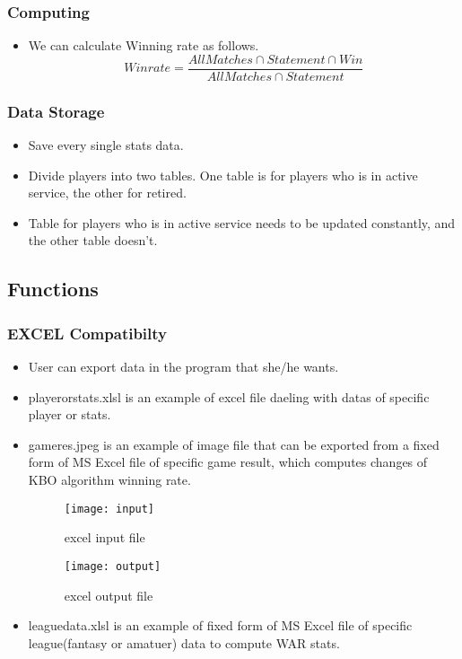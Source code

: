 \documentclass[conference,compsoc, twocolumn]{IEEEtran}
\begin{document}
\subsubsection{Computing}

\begin{itemize}
\item We can calculate Winning rate as follows. 
\begin{equation} \label{eq:winrate} Winrate = \frac{All Matches\cap Statement\cap Win}{All Matches\cap Statement} \end{equation}
\end{itemize}



\subsubsection{Data Storage}
\begin{itemize}
\item Save every single stats data.
\item Divide players  into two tables. One table is for players who is in active service, the other for retired.
\item Table for players who is in active service needs to be updated constantly, and the other table doesn’t.
\end{itemize}



\subsection{Functions}

\subsubsection{EXCEL Compatibilty}

\begin{itemize}
\item User can export data in the program that she/he wants.
\item playerorstats.xlsl is an example of excel file daeling with datas of specific player or stats.
\item gameres.jpeg is an example of image file that can be exported from a fixed form of MS Excel file of specific game result, which computes changes of KBO 
algorithm winning rate.

\begin{figure}[H]
\centering\texttt{[image: input]}
\caption{excel input file}
\end{figure}

\begin{figure}[H]
\centering\texttt{[image: output]}
\caption{excel output file}
\end{figure}
\item leaguedata.xlsl is an example of fixed form of MS Excel file of specific league(fantasy or amatuer) data to compute WAR stats.
\end{itemize}
\end{document}
